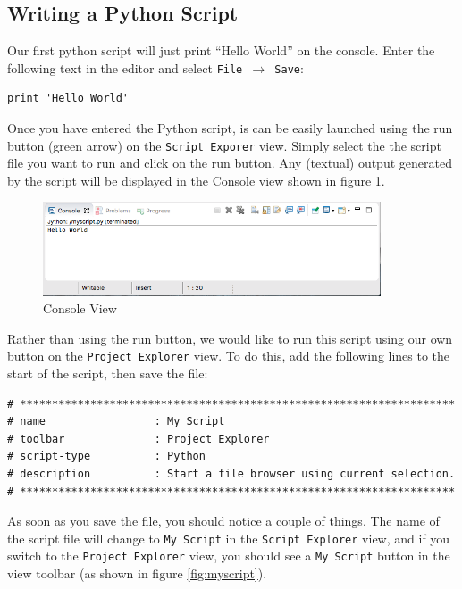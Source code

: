 \subsection{Writing a Python Script}

Our first python script will just print ``Hello World'' on the console. Enter
the following text in the editor and select \texttt{File $\rightarrow$ Save}:

\begin{verbatim}
print 'Hello World'
\end{verbatim}

Once you have entered the Python script, is can be easily launched using the run
button (green arrow) on the \texttt{Script Exporer} view. Simply select the
the script file you want to run and click on the run button. Any (textual)
output generated by the script will be displayed in the Console view shown in
figure \ref{fig:console}.

\begin{figure}[!ht]
\centering
\includegraphics[width=10cm]{images/console}
\caption{Console View}
\label{fig:console}
\end{figure}

Rather than using the run button, we would like to run this script using our own
button on the \texttt{Project Explorer} view. To do this, add the following
lines to the start of the script, then save the file:

{\small
\begin{verbatim}
# ********************************************************************  
# name                 : My Script 
# toolbar              : Project Explorer  
# script-type          : Python  
# description          : Start a file browser using current selection.  
# ******************************************************************** 
\end{verbatim}
}

As soon as you save the file, you should notice a couple of things. The name of
the script file will change to \texttt{My Script} in the \texttt{Script
Explorer} view, and if you switch to the \texttt{Project Explorer} view, you
should see a \texttt{My Script} button in the view toolbar (as shown in figure
\ref{fig:myscript}).

